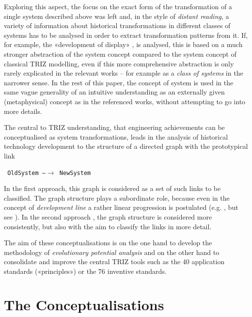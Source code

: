 \documentclass[11pt,a4paper]{article}
\begin{document}
Exploring this aspect, the focus on the exact form of the transformation of a
single system described above was left and, in the style of \emph{distant
  reading}, a variety of information about historical transformations in
different classes of systems has to be analysed in order to extract
transformation patterns from it.  If, for example, the «development of
display» \cite[p. 22]{TESE2018}, \cite[ch. 5]{Shpakovsky2016} is analysed,
this is based on a much stronger abstraction of the system concept compared to
the system concept of classical TRIZ modelling, even if this more
comprehensive abstraction is only rarely explicated in the relevant works --
for example as a \emph{class of systems} in the narrower sense. In the rest of
this paper, the concept of system is used in the same vague generality of an
intuitive understanding as an externally given (metaphysical) concept as in
the referenced works, without attempting to go into more details.

The central to TRIZ understanding, that engineering achievements can be
conceptualised as system transformations, leads in the analysis of historical
technology development to the structure of a directed graph with the
prototypical link
\begin{center}\tt
  OldSystem \textrm{---}$\to$ NewSystem
\end{center}
In the first approach, this graph is considered as a set of such links to be
classified. The graph structure plays a subordinate role, because even in the
concept of \emph{development line} a rather linear progression is postulated
(e.g. \cite[Figure 4.104]{KS}, but see \cite[4.8.4 and Figure 4.72]{KS}). In
the second approach \cite{Shpakovsky2016}, the graph structure is considered
more consistently, but also with the aim to classify the links in more detail.

The aim of these conceptualisations is on the one hand to develop the
methodology of \emph{evolutionary potential analysis} \cite[4.8.7]{KS} and on
the other hand to consolidate and improve the central TRIZ tools such as the
40 application standards («principles») or the 76 inventive standards.

\section{The Conceptualisations}
\end{document}
